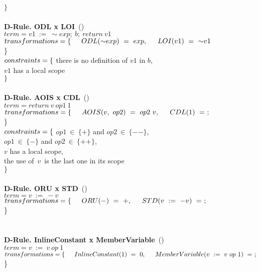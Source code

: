 $\}$
\\
\\
\textbf{D-Rule. ODL x LOI}~(\mujava{})\\
$term = v1~:=~{\sim}exp;~b;~return~v1 $\\
$transformations = \{\\ \indent ODL({\sim}exp)~=~exp,\\ \indent LOI(v1)~=~{\sim}v1$\\\}\\
$constraints = \{ \\$ 
\indent there is no definition of $v1$ in $b$, \\ 
\indent $v1$ has a local scope \\ 
$\}$
\\
\\
\textbf{D-Rule. AOIS x CDL}~(\mujava{})\\
$term = return~v~op1~1 $\\
$transformations = \{\\ \indent AOIS(v,~op2)~=~op2~v,\\ \indent CDL(1)~=~;$\\\}\\
$constraints = \{ \\$ 
\indent $op1~\in~\{+\} $ and $op2~\in~\{--\}$, \\ 
\indent $op1~\in~\{-\} $ and $op2~\in~\{++\}$, \\ 
\indent $v$ has a local scope, \\ 
\indent the use of~$v$~is the last one in its scope \\ 
$\}$
\\
\\
\textbf{D-Rule. ORU x STD}~(\major{})\\
$term = v~:=~-v $\\
$transformations = \{\\ \indent ORU(-)~=~+,\\ \indent STD(v~:=~-v)~=~;$\\\}\\
\\
\\
\textbf{D-Rule. InlineConstant x MemberVariable}~(\pit{})\\
$term = v~:=~v~op~1 $\\
$transformations = \{\\ \indent InlineConstant(1)~=~0,\\ \indent MemberVariable(v~:=~v~op~1)~=~;$\\\}\\

